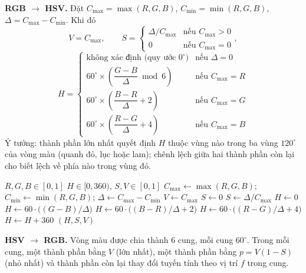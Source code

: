\textbf{RGB $\rightarrow$ HSV.} Đặt $C_{\max} = \max(R, G, B)$, $C_{\min} = \min(R, G, B)$, $\Delta = C_{\max} - C_{\min}$. Khi đó
\begin{equation}
V = C_{\max}, \qquad
S = \begin{cases} \Delta / C_{\max} & \text{nếu } C_{\max} > 0 \\ 0 & \text{nếu } C_{\max} = 0 \end{cases},
\end{equation}
\begin{equation}
H = \begin{cases}
\text{không xác định (quy ước } 0^\circ) & \text{nếu } \Delta = 0 \\
60^\circ \times \left( \dfrac{G - B}{\Delta} \bmod 6 \right) & \text{nếu } C_{\max} = R \\
60^\circ \times \left( \dfrac{B - R}{\Delta} + 2 \right) & \text{nếu } C_{\max} = G \\
60^\circ \times \left( \dfrac{R - G}{\Delta} + 4 \right) & \text{nếu } C_{\max} = B
\end{cases}
\end{equation}
Ý tưởng: thành phần lớn nhất quyết định $H$ thuộc vùng nào trong ba vùng $120^\circ$ của vòng màu (quanh đỏ, lục hoặc lam); chênh lệch giữa hai thành phần còn lại cho biết lệch về phía nào trong vùng đó.

\begin{algorithm}[ht]
\caption{Chuyển đổi RGB sang HSV}
\label{alg:w4_rgb2hsv}
\begin{algorithmic}[1]
\Require $R, G, B \in [0, 1]$
\Ensure $H \in [0, 360)$, $S, V \in [0, 1]$
\State $C_{\max} \gets \max(R, G, B)$; \quad $C_{\min} \gets \min(R, G, B)$; \quad $\Delta \gets C_{\max} - C_{\min}$
\State $V \gets C_{\max}$
 \State $S \gets 0$ \Else \State $S \gets \Delta / C_{\max}$ \EndIf
{}
    \State $H \gets 0$ 
    \State $H \gets 60 \cdot \big((G - B)/\Delta\big)$
    \State $H \gets 60 \cdot \big((B - R)/\Delta + 2\big)$
\Else
    \State $H \gets 60 \cdot \big((R - G)/\Delta + 4\big)$
\EndIf
{} \State $H \gets H + 360$ \EndIf
\State \Return $(H, S, V)$
\end{algorithmic}
\end{algorithm}

\textbf{HSV $\rightarrow$ RGB.} Vòng màu được chia thành $6$ cung, mỗi cung $60^\circ$. Trong mỗi cung, một thành phần bằng $V$ (lớn nhất), một thành phần bằng $p = V(1 - S)$ (nhỏ nhất) và thành phần còn lại thay đổi tuyến tính theo vị trí $f$ trong cung.

